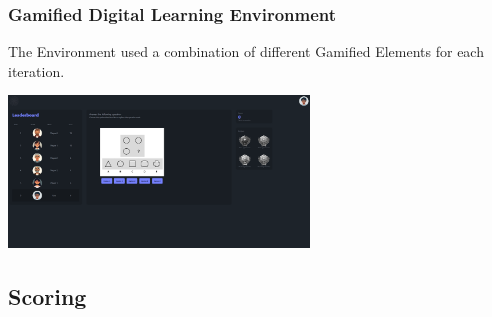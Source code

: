 \subsubsection{Gamified Digital Learning Environment}
The Environment used a combination of different Gamified Elements for each iteration.
\begin{minipage}{\textwidth}
  \centering
  \includegraphics[width=0.6\textwidth]{img/question_screen.png}
  \label{fig:figureScreen}
\end{minipage}

\subsection{Scoring}
